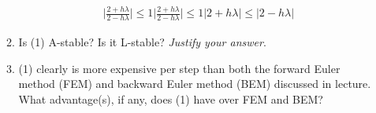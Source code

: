 \documentclass{article}
\begin{document}
\begin{enumerate}
\begin{enumerate}
\begin{align*}
                    \bigg| \frac{2 + h \lambda}{2-h\lambda} \bigg| \leq 1
                    \bigg| \frac{2 + h \lambda}{2-h\lambda} \bigg| \leq 1
                    | 2 + h \lambda | \leq |2-h\lambda|
                \end{align*}
            \item Is (1) A-stable? Is it L-stable? \textit{Justify your 
                answer}.
            \item (1) clearly is more expensive per step than both the
                forward Euler method (FEM) and backward Euler method
                (BEM) discussed in lecture. What advantage(s), if any,
                does (1) have over FEM and BEM?
        \end{enumerate}
\end{enumerate}
\end{document}
